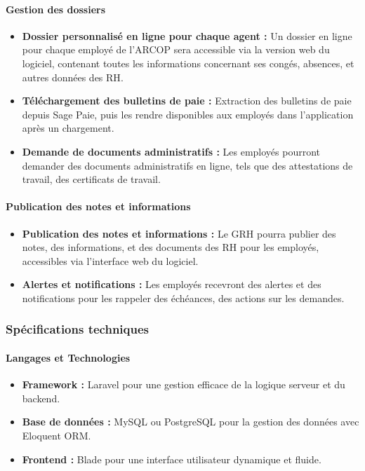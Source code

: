 \paragraph{Gestion des dossiers}
\begin{itemize}
    \item \textbf{Dossier personnalisé en ligne pour chaque agent :} Un dossier en ligne pour chaque employé de l'\ac{ARCOP} sera accessible via la version web du logiciel, contenant toutes les informations concernant ses congés, absences, et autres données des \ac{RH}.
    
    \item \textbf{Téléchargement des bulletins de paie :} Extraction des bulletins de paie depuis Sage Paie, puis les rendre disponibles aux employés dans l'application après un chargement.
    \item \textbf{Demande de documents administratifs :} Les employés
    pourront demander des documents administratifs en ligne, tels que des attestations de travail, des certificats de travail.
\end{itemize}

\paragraph{Publication des notes et informations}
\begin{itemize}
    \item \textbf{Publication des notes et informations :} Le GRH pourra publier des notes, des informations, et des documents des \ac{RH} pour les employés, accessibles via l'interface web du logiciel.
    \item \textbf{Alertes et notifications :} Les employés recevront des alertes et des notifications pour les rappeler des échéances, des actions sur les demandes.
\end{itemize}

\subsubsection{Spécifications techniques}

\paragraph{Langages et Technologies}
\begin{itemize}
    \item \textbf{Framework :} Laravel pour une gestion efficace de la logique serveur et du backend.
    \item \textbf{Base de données :} MySQL ou PostgreSQL pour la gestion des données avec Eloquent ORM.
    \item \textbf{Frontend :} Blade pour une interface utilisateur dynamique et fluide.

\end{itemize}


